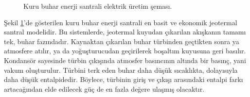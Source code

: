 \begin{figure}[htbp]


\caption{Kuru buhar enerji santrali elektrik üretim şeması.}
\label{fig:kurubuhar}
\end{figure}

Şekil \ref{fig:kurubuhar}'de gösterilen kuru buhar enerji santrali en basit ve ekonomik jeotermal santral modelidir. Bu sistemlerde, jeotermal kuyudan çıkarılan akışkanın tamamı tek, buhar fazındadır. Kaynaktan çıkarılan buhar türbinden geçtikten sonra ya atmosfere atılır, ya da yoğuşturucudan geçirilerek boşaltım kuyusuna geri basılır. Kondansör sayesinde türbin çıkışında atmosfer basıncının altında bir basınç, yani vakum oluşturulur. Türbini terk eden buhar daha düşük sıcaklıkta, dolayısıyla daha düşük entalpidedir\cite{atalay}. Böylece, türbinin giriş ve çıkışı arasındaki entalpi farkı artacağından elde edilecek güç de en fazla değere ulaşmış olacaktır. 

